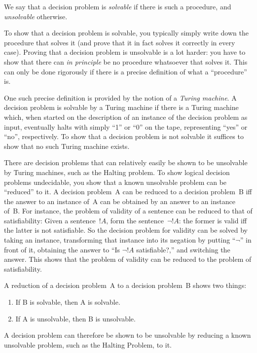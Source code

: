 \documentclass[../../include/open-logic-section]{subfiles}
\begin{document}
\begin{explain}
We say that a decision problem is \emph{solvable} if there is such a
procedure, and \emph{unsolvable} otherwise.  

To show that a decision problem is solvable, you typically simply
write down the procedure that solves it (and prove that it in fact
solves it correctly in every case).  Proving that a decision problem
is unsolvable is a lot harder: you have to show that there can
\emph{in principle} be no procedure whatsoever that solves it.  This
can only be done rigorously if there is a precise definition of what a
``procedure'' is.

One such precise definition is provided by the notion of a
\emph{Turing machine}.  A decision problem is solvable by a Turing
machine if there is a Turing machine which, when started on the
description of an instance of the decision problem as input,
eventually halts with simply ``1'' or ``0'' on the tape, representing
``yes'' or ``no'', respectively.  To show that a decision problem is
not solvable it suffices to show that no such Turing machine exists.

There are decision problems that can relatively easily be shown to be
unsolvable by Turing machines, such as the Halting problem.  To show
logical decision problems undecidable, you show that a known
unsolvable problem can be ``reduced'' to it.  A decision problem~A can
be reduced to a decision problem~B iff the answer to an instance of~A
can be obtained by an answer to an instance of~B.  For instance, the
problem of validity of a sentence can be reduced to that of
satisfiability: Given a sentence~$!A$, form the sentence~$\lnot !A$:
the former is valid iff the latter is not satisfiable. So the decision
problem for validity can be solved by taking an instance, transforming
that instance into its negation by putting ``$\lnot$'' in front of it,
obtaining the answer to ``Is $\lnot !A$ satisfiable?,'' and switching
the answer.  This shows that the problem of validity can be reduced to
the problem of satisfiability.

A reduction of a decision problem~A to a decision problem~B shows two things:
\begin{enumerate}
\item If B is solvable, then A is solvable.
\item If A is unsolvable, then B is unsolvable.
\end{enumerate}

A decision problem can therefore be shown to be unsolvable by reducing
a known unsolvable problem, such as the Halting Problem, to it.
\end{explain}
\end{document}
